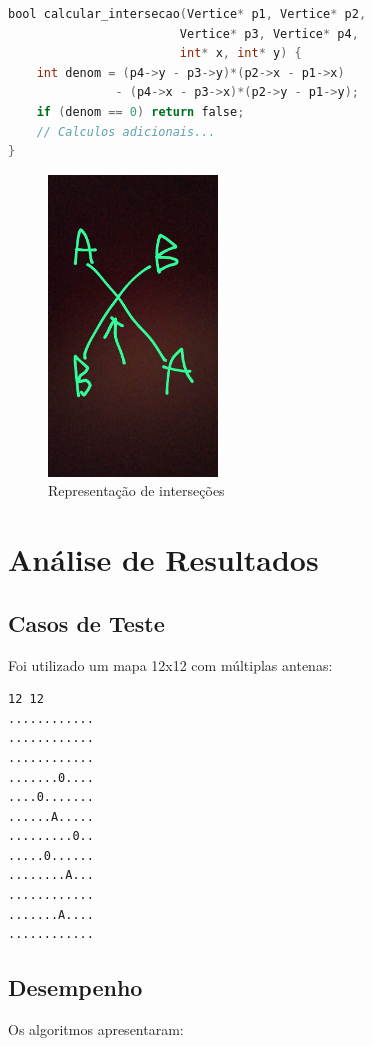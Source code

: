 \documentclass[a4paper,12pt]{report}
\begin{document}
\begin{lstlisting}[language=C]
bool calcular_intersecao(Vertice* p1, Vertice* p2, 
                        Vertice* p3, Vertice* p4, 
                        int* x, int* y) {
    int denom = (p4->y - p3->y)*(p2->x - p1->x) 
               - (p4->x - p3->x)*(p2->y - p1->y);
    if (denom == 0) return false;
    // Calculos adicionais...
}
\end{lstlisting}

\begin{figure}[H]
\centering
\includegraphics[width=0.4\textwidth]{intersecoes.png}
\caption{Representação de interseções}
\label{fig:grafo}
\end{figure}

\chapter{Análise de Resultados}
\section{Casos de Teste}
Foi utilizado um mapa 12x12 com múltiplas antenas:

\begin{lstlisting}[basicstyle=\ttfamily\small]
12 12
............
............
............
.......0....
....0.......
......A.....
.........0..
.....0......
........A...
............
.......A....
............
\end{lstlisting}

\section{Desempenho}
Os algoritmos apresentaram:
\end{document}
